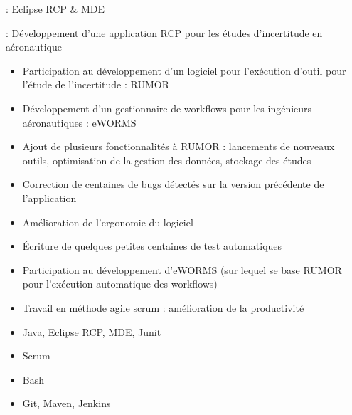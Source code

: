 

 : Eclipse RCP \& MDE

 : Développement d’une application RCP pour les études d'incertitude en aéronautique

\bigskip


\begin{itemize}
\item Participation au développement d'un logiciel pour l'exécution d'outil pour l'étude de l'incertitude : RUMOR
\item Développement d'un gestionnaire de workflows pour les ingénieurs aéronautiques : eWORMS
\end{itemize} 


\begin{itemize}	
\item Ajout de plusieurs fonctionnalités à RUMOR : lancements de nouveaux outils, optimisation de la gestion des données, stockage des études
\item Correction de centaines de bugs détectés sur la version précédente de l'application
\item Amélioration de l'ergonomie du logiciel
\item Écriture de quelques petites centaines de test automatiques
\item Participation au développement d'eWORMS (sur lequel se base RUMOR pour l'exécution automatique des workflows)
\item Travail en méthode agile scrum : amélioration de la productivité
\end{itemize} 


\begin{itemize}
\item Java, Eclipse RCP, MDE, Junit
\item Scrum
\item Bash
\item Git, Maven, Jenkins
\end{itemize} 